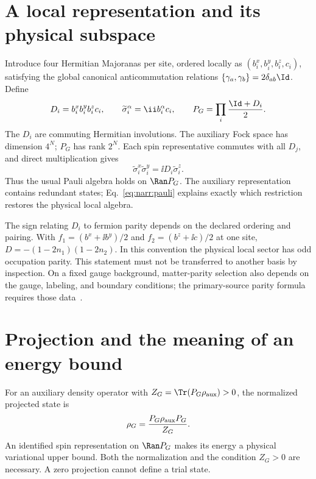 \section{A local representation and its physical subspace}
Introduce four Hermitian Majoranas per site, ordered locally as
$(b_i^x,b_i^y,b_i^z,c_i)$, satisfying the global canonical anticommutation
relations $\{\gamma_a,\gamma_b\}=2\delta_{ab}\Id$. Define
\begin{equation}
 D_i=b_i^x b_i^y b_i^z c_i,\qquad
 \widetilde\sigma_i^\alpha=\ii b_i^\alpha c_i,\qquad
 P_G=\prod_i\frac{\Id+D_i}{2}.
 \label{eq:narr:projection}
\end{equation}
The $D_i$ are commuting Hermitian involutions. The auxiliary Fock space has
dimension $4^N$; $P_G$ has rank $2^N$. Each spin representative commutes with
all $D_j$, and direct multiplication gives
\begin{equation}
 \widetilde\sigma_i^x\widetilde\sigma_i^y
   =\ii D_i\widetilde\sigma_i^z.
 \label{eq:narr:pauli}
\end{equation}
Thus the usual Pauli algebra holds on $\Ran P_G$. The auxiliary representation
contains redundant states; Eq.~\eqref{eq:narr:pauli} explains exactly which
restriction restores the physical local algebra.

The sign relating $D_i$ to fermion parity depends on the declared ordering and
pairing. With $f_1=(b^x+\ii b^y)/2$ and $f_2=(b^z+\ii c)/2$ at one site,
$D=-(1-2n_1)(1-2n_2)$. In this convention the physical local sector has odd
occupation parity. This statement must not be transferred to another basis by
inspection. On a fixed gauge background, matter-parity selection also depends
on the gauge, labeling, and boundary conditions; the primary-source parity
formula requires those data~\cite{Pedrocchi2011}.

\section{Projection and the meaning of an energy bound}
For an auxiliary density operator with
$Z_G=\Tr(P_G\rho_{\rm aux})>0$, the normalized projected state is
\begin{equation}
 \rho_G=\frac{P_G\rho_{\rm aux}P_G}{Z_G}.
 \label{eq:narr:normalized_projection}
\end{equation}
An identified spin representation on $\Ran P_G$ makes its energy a physical
variational upper bound. Both the normalization and the condition $Z_G>0$
are necessary. A zero projection cannot define a trial state.

